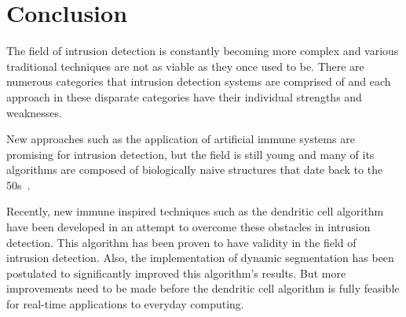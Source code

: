 \documentclass{umm-senior-sem}
\begin{document}
\section{Conclusion}
\label{sec:Conclusion}
The field of intrusion detection is constantly becoming more complex and various traditional techniques are not as viable as they once used to be. There are numerous categories that intrusion detection systems are comprised of and each approach in these disparate categories have their individual strengths and weaknesses. 

New approaches such as the application of artificial immune systems are promising for intrusion detection, but the field is still young and many of its algorithms are composed of biologically naive structures that date back to the 50s~\cite{greensmith_thesis:2007}.

Recently, new immune inspired techniques such as the dendritic cell algorithm have been developed in an attempt to overcome these obstacles in intrusion detection. This algorithm has been proven to have validity in the field of intrusion detection. Also, the implementation of dynamic segmentation has been postulated to significantly improved this algorithm's results. But more improvements need to be made before the dendritic cell algorithm is fully feasible for real-time applications to everyday computing.

\nocite{*}



\end{document}
